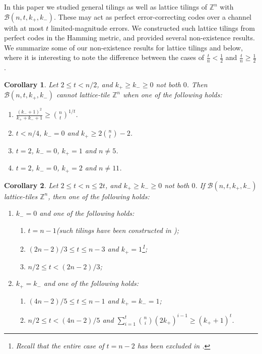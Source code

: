 \documentclass[sort&compress]{elsarticle}
\renewcommand{\leq}{\leqslant}
\renewcommand{\geq}{\geqslant}
\newtheorem{corollary}{Corollary}
\newcommand{\Z}{\mathbb{Z}}
\newcommand{\kp}{k_+}
\newcommand{\km}{k_-}
\newcommand{\BALL}{{\mathcal B}(n,t,\kp,\km)}
\begin{document}
In this paper we studied general tilings as well as lattice tilings of
$\Z^n$ with $\BALL$. These may act as perfect error-correcting codes
over a channel with at most $t$ limited-magnitude errors. We
constructed such lattice tilings from perfect codes in the Hamming
metric, and provided several non-existence results. We summarize some
of our non-existence results for lattice tilings and below, where it is
interesting to note the difference between the cases of
$\frac{t}{n}<\frac{1}{2}$ and $\frac{t}{n}\geq \frac{1}{2}$.


\begin{corollary}
Let $2\leq t < n/2$, and $\kp\geq \km\geq 0$ not both $0$.  Then
$\BALL$ cannot lattice-tile $\Z^n$ when one of the following holds:
\begin{enumerate}
\item $\frac{(\km+1)^2}{\kp+\km+1} \geq \binom{n}{t}^{1/t}$.
\item $t <n/4$, $\km=0$ and $\kp\geq  2 \binom{n}{t}-2$.
\item $t=2$, $\km=0$, $\kp=1$ and  $n\neq 5$.
\item  $t=2$, $\km=0$, $\kp=2$ and $n\neq 11$.
\end{enumerate}
\end{corollary}


\begin{corollary}
Let  $2\leq  t < n\leq 2t$, and $\kp\geq \km\geq 0$ not both $0$. If $\BALL$ lattice-tiles $\Z^n$, then one of the following holds:
\begin{enumerate}
\item $\km=0$ and one of the following holds:
 \begin{enumerate}
  \item $t=n-1$(such tilings  have been constructed in \cite{Ste90,BuzEtz12});
  \item $(2n-2)/3 \leq t \leq n-3$ and $\kp=1$\footnote{Recall that the entire case of $t=n-2$ has been excluded in  \cite{BuzEtz12}.};
  \item $n/2\leq t<(2n-2)/3$;
 \end{enumerate}
\item $\kp=\km$ and one of the following holds:
 \begin{enumerate}
  \item $(4n-2)/5 \leq t \leq n-1$ and $\kp=\km=1$;
  \item $n/2 \leq t < (4n-2)/5$ and $\sum_{i=1}^t{n\choose i} (2\kp)^{i-1} \geq (\kp+1)^{t}$.
 \end{enumerate}
\end{enumerate}
\end{corollary}
\end{document}
